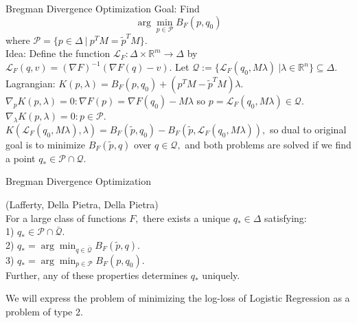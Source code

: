 \documentclass[10pt]{beamer}
\begin{document}
\begin{frame}{Bregman Divergence Optimization}
Goal: Find $$\arg \min_{p\in \mathcal{P}} B_F(p, q_0)$$ where $\mathcal{P} = \{ p \in \Delta \ | \ p^TM = \tilde{p}^TM\}.$  \
\newline \\
Idea: Define the function $\mathcal{L}_F : \Delta \times \mathbb{R}^m \to \Delta$ by $\mathcal{L}_F(q,v) = (\nabla F)^{-1}( \nabla F(q) -v).$ Let $\mathcal{Q} := \{ \mathcal{L}_F(q_0, M\lambda) \ | \lambda \in \mathbb{R}^n \} \subseteq \Delta.$ \
\newline \\
Lagrangian: $K(p,\lambda) = B_F(p,q_0) + (p^TM - \tilde{p}^TM)\lambda.$
$\nabla_p K(p,\lambda) = 0: \nabla F(p) = \nabla F(q_0) - M\lambda$ so  $p = \mathcal{L}_F(q_0, M\lambda)\in \mathcal{Q}.$\\
$\nabla_{\lambda} K(p,\lambda)= 0 : p \in \mathcal{P}.$\
\newline \\
$K(\mathcal{L}_F(q_0, M\lambda), \lambda) = B_F(\tilde{p}, q_0) - B_F(\tilde{p}, \mathcal{L}_F(q_0, M\lambda)),$ so dual to original goal is to minimize $B_F(\tilde{p}, q)$ over $q\in \mathcal{Q},$ and both problems are solved if we find a point $q_* \in \mathcal{P}\cap \mathcal{Q}.$ 
\end{frame}

\begin{frame}{Bregman Divergence Optimization}
\begin{Theorem} (Lafferty, Della Pietra, Della Pietra)\\
 For a large class of functions $F,$ there exists a unique $q_*\in \Delta$ satisfying:\\
 1) $q_* \in \mathcal{P} \cap \bar{\mathcal{Q}}.$\\
 2) $q_* = \arg \min_{q\in \bar{\mathcal{Q}}} B_F (\tilde{p}, q).$\\
 3) $q_* = \arg \min_{p\in \mathcal{P}} B_F(p, q_0).$\\
 Further, any of these properties determines $q_*$ uniquely. 
\end{Theorem}
 We will express the problem of minimizing the log-loss of Logistic Regression as a problem of type 2.
\end{frame}
\end{document}
